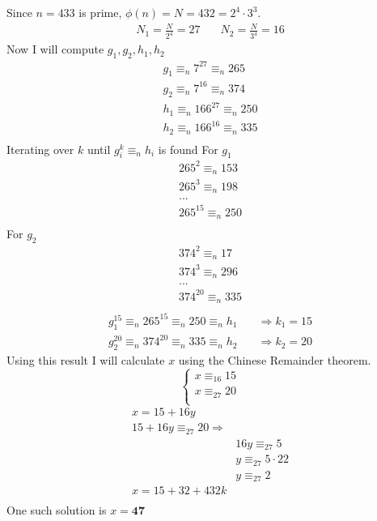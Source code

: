 \documentclass{article}
\begin{document}
\section{}
Since $n = 433$ is prime, $\phi(n) = N = 432 = 2^{4} \cdot 3^{3}$.
\[
\begin{split}
N_{1} = \frac{N}{2^{4}} = 27 &\quad N_{2} = \frac{N}{3^{4}} = 16
\end{split}
\]
Now I will compute $g_{1}, g_{2}, h_{1}, h_{2}$
\[
\begin{split}
g_{1} \equiv_{n} 7^{27} \equiv_{n} 265 \\
g_{2} \equiv_{n} 7^{16} \equiv_{n} 374 \\
h_{1} \equiv_{n} 166^{27} \equiv_{n} 250 \\
h_{2} \equiv_{n} 166^{16} \equiv_{n} 335 \\
\end{split}
\]
Iterating over $k$ until $g_{i}^k \equiv_{n} h_{i}$ is found
\newline
For $g_{1}$
\[
\begin{split}
265^{2} \equiv_{n} 153 \\
265^{3} \equiv_{n} 198 \\
... \\
265^{15} \equiv_{n} 250 \\
\end{split}
\]
For $g_{2}$
\[
\begin{split}
374^{2} \equiv_{n} 17 \\
374^{3} \equiv_{n} 296 \\
... \\
374^{20} \equiv_{n} 335 \\
\end{split}
\]
\[
\begin{split}
g_{1}^{15} \equiv_{n} 265^{15} \equiv_{n} 250 \equiv_{n} h_{1} &\quad \Rightarrow k_{1} = 15 \\
g_{2}^{20} \equiv_{n} 374^{20} \equiv_{n} 335 \equiv_{n} h_{2} &\quad \Rightarrow k_{2} = 20
\end{split}
\]
Using this result I will calculate $x$ using the Chinese Remainder theorem.
\[
\begin{cases}
x \equiv_{16} 15 \\
x \equiv_{27} 20 \\
\end{cases}
\]
\[
\begin{split}
x = 15 + 16y \\
15 + 16y \equiv_{27} 20 \Rightarrow & \\
&16y \equiv_{27} 5 \\
&y \equiv_{27} 5 \cdot 22 \\
&y \equiv_{27} 2 \\
x = 15 + 32 + 432k \\
\end{split}
\]
One such solution is $x = \textbf{47}$
\end{document}

